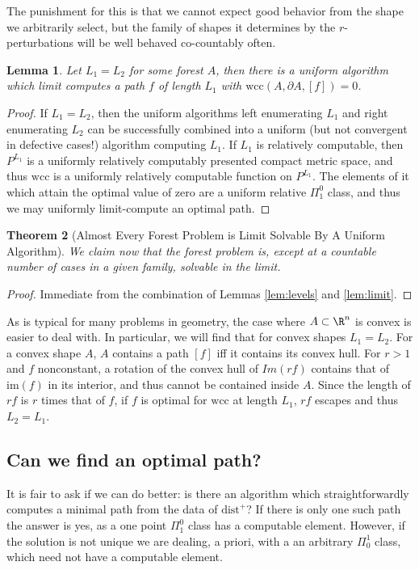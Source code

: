 \documentclass{journal}
\newtheorem{thm}{Theorem}[section]    %
\newtheorem{lem}[thm]{Lemma}          %
\theoremstyle{definition}
\begin{document}
The punishment for this is that we cannot expect good behavior from the shape we arbitrarily select, but the family of shapes it determines by the $r$-perturbations will be well behaved co-countably often.

\begin{lem}
Let $L_1 = L_2$ for some forest $A$, then there is a uniform algorithm which limit computes a path $f$ of length $L_1$ with $\mathrm{wcc}(A,\partial A, [f]) = 0$.
\end{lem}
\label{lem:limit}
\begin{proof}
If $L_1 = L_2$, then the uniform algorithms left enumerating $L_1$ and right enumerating $L_2$ can be successfully combined into a uniform (but not convergent in defective cases!) algorithm computing $L_1$. If $L_1$ is relatively computable, then $P^{L_1}$ is a uniformly relatively computably presented compact metric space, and thus $\mathrm{wcc}$ is a uniformly relatively computable function on $P^{L_1}$. The elements of it which attain the optimal value of zero are a uniform relative $\Pi^0_1$ class, and thus we may uniformly limit-compute an optimal path.
\end{proof}

\begin{thm}[Almost Every Forest Problem is Limit Solvable By A Uniform Algorithm]
We claim now that the forest problem is, except at a countable number of cases in a given family, solvable in the limit.
\end{thm}
\label{thm:almost}

\begin{proof}
    Immediate from the combination of Lemmas \ref{lem:levels} and \ref{lem:limit}.
\end{proof}

As is typical for many problems in geometry, the case where $A\subset \R^n$ is convex is easier to deal with. In particular, we will find that for convex shapes $L_1 = L_2$. For a convex shape $A$, $A$ contains a path $[f]$ iff it contains its convex hull. For $r > 1$ and $f$ nonconstant, a rotation of the convex hull of $ Im(r f)$ contains that of $\mathrm{im}(f)$ in its interior, and thus cannot be contained inside $A$. Since the length of $rf$ is $r$ times that of $f$, if $f$ is optimal for $\mathrm{wcc}$ at length $L_1$, $rf$ escapes and thus $L_2 = L_1$.

\subsection{Can we find an optimal path?}
\label{sec:canwe?}
It is fair to ask if we can do better: is there an algorithm which straightforwardly computes a minimal path from the data of $\mathrm{dist}^+$? If there is only one such path the answer is yes, as a one point $\Pi^0_1$ class has a computable element. However, if the solution is not unique we are dealing, a priori, with a an arbitrary $\Pi_0^1$ class, which need not have a computable element. 
\end{document}
